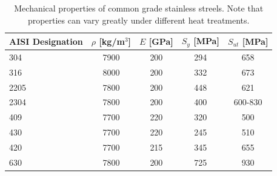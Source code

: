 \documentclass[
10pt,
a4paper,
openany,
svgnames,
]{book}
\begin{document}
\begin{table}[H]
  \centering
  \caption[Mechanical properties of common grade stainless steels]{Mechanical properties of common grade stainless streels. Note that properties can vary greatly under different heat treatments.}
  \label{tab: stainless steel props and uses}
  \begin{tabular}{lcccc}
    \toprule
    AISI Designation & $\rho$ [kg/m$^3$] & $E$ [GPa] & $S_y$ [MPa] & $S_{ut}$ [MPa] \\
    \midrule
    304  & 7900 & 200 & 294 & 658 \\
    316  & 8000 & 200 & 332 & 673 \\
    2205 & 7800 & 200 & 448 & 621 \\
    2304 & 7800 & 200 & 400 & 600-830 \\
    409  & 7700 & 220 & 320 & 500 \\
    430  & 7700 & 220 & 245 & 510 \\
    420  & 7700 & 215 & 345 & 655 \\
    630  & 7800 & 200 & 725 & 930 \\
    \bottomrule
  \end{tabular}
\end{table}
\end{document}
